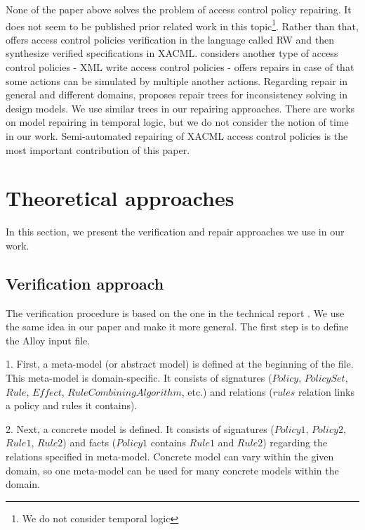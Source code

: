 \documentclass{acm_proc_article-sp}
\begin{document}
None of the paper above solves the problem of access control policy repairing. It does not seem to be published prior related work in this topic\footnote[2]{We do not consider temporal logic}. Rather than that, \cite{Zhang:2004:SVA:1029133.1029141} offers access control policies verification in the language called RW and then synthesize verified specifications in XACML. \cite{Bravo:2007:RIX:1783534.1783545} considers another type of access control policies - XML write access control policies - offers repairs in case of that some actions can be simulated by multiple another actions. Regarding repair in general and different domains, \cite{Reder:2012:CRT:2351676.2351707} proposes repair trees for inconsistency solving in design models. We use similar trees in our repairing approaches. There are works on model repairing in temporal logic, but we do not consider the notion of time in our work. Semi-automated repairing of XACML access control policies is the most important contribution of this paper. 

\section{Theoretical approaches}

In this section, we present the verification and repair approaches we use in our work.

\subsection{Verification approach}
\label{sec:verification}

The verification procedure is based on the one in the technical report \cite{acp:alloy}. We use the same idea in our paper and make it more general.
The first step is to define the Alloy input file.

1. First, a meta-model (or abstract model) is defined at the beginning of the file. This meta-model is domain-specific. It consists of signatures ($Policy$, $PolicySet$, $Rule$, $Effect$, $RuleCombiningAlgorithm$, etc.) and relations ($rules$ relation links a policy and rules it contains).

2. Next, a concrete model is defined. It consists of signatures ($Policy1$, $Policy2$, $Rule1$, $Rule2$) and facts ($Policy1$ contains $Rule1$ and $Rule2$) regarding the relations specified in meta-model. Concrete model can vary within the given domain, so one meta-model can be used for many concrete models within the domain.
\end{document}
